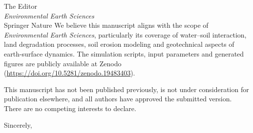 \documentclass[11pt,a4paper]{letter}
\begin{document}
\begin{letter}{The Editor\\
\textit{Environmental Earth Sciences}\\
Springer Nature}
We believe this manuscript aligns with the scope of \textit{Environmental Earth Sciences}, particularly its coverage of water--soil interaction, land degradation processes, soil erosion modeling and geotechnical aspects of earth-surface dynamics. The simulation scripts, input parameters and generated figures are publicly available at Zenodo (\url{https://doi.org/10.5281/zenodo.19483403}).

This manuscript has not been published previously, is not under consideration for publication elsewhere, and all authors have approved the submitted version. There are no competing interests to declare.

\closing{Sincerely,}

\end{letter}
\end{document}
